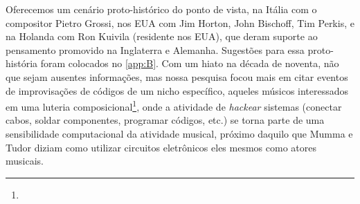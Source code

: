Oferecemos um cenário proto-histórico do ponto de vista, na Itália com o compositor Pietro Grossi, nos EUA com Jim Horton, John Bischoff, Tim Perkis, e na Holanda com Ron Kuivila (residente nos EUA), que deram suporte ao pensamento promovido na Inglaterra e Alemanha. Sugestões para essa proto-história foram colocados no \autoref{app:B}. Com um hiato na década de noventa, não que sejam ausentes informações, mas nossa pesquisa focou mais em citar eventos de improvisações de códigos de um nicho específico, aqueles músicos interessados em uma luteria composicional\footnote{}, onde a atividade de \emph{hackear} sistemas (conectar cabos, soldar componentes, programar códigos, etc.) se torna parte de uma sensibilidade computacional da atividade musical, próximo daquilo que Mumma e Tudor diziam como utilizar circuitos eletrônicos eles mesmos como atores musicais.